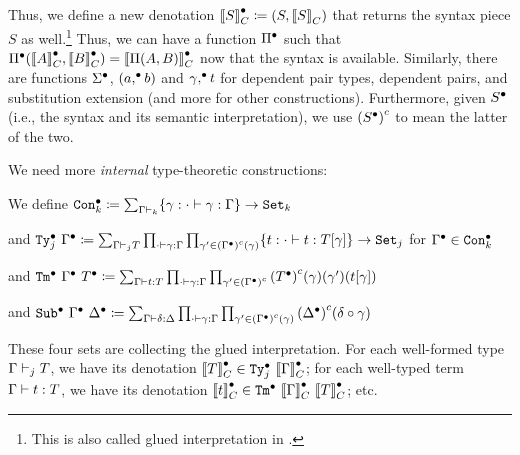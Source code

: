 Thus, we define a new denotation $\denotesCC{S} \coloneq (S, \denotesC{S})$
that returns the syntax piece $S$ as well.\footnote{This is also called
glued interpretation in \citet{sterling2019algebraic}.}
Thus, we can have a
function $\Glued{\Pi}$ such that $\GluedPi{\denotesCC{A}}{\denotesCC{B}} =
\denotesCC{\TyPi{A}{B}}$ now that the syntax is available.
Similarly, there are functions $\Glued{\Sigma}$, $\Gpair{a}{b}$  and
$\GSubstExt{\gm}{t}$ for dependent pair types, dependent pairs, and
substitution extension (and more for other constructions).
Furthermore, given $\Glued{S}$ (i.e., the syntax and its semantic interpretation),
we use $\Gmodel{\Glued{S}}$ to mean the latter of the two.

\newcommand{\GTy}[2]{\ensuremath{\Glued{\texttt{Ty}}_{#1}~{#2}}}
\newcommand{\GCon}[1]{\ensuremath{\Glued{\texttt{Con}}_{#1}}}
\newcommand{\GTm}[2]{\ensuremath{\Glued{\texttt{Tm}}~{#1}~{#2}}}
\newcommand{\GSub}[2]{\ensuremath{\Glued{\texttt{Sub}}~{#1}~{#2}}}
\newcommand{\GMWSig}[3]{\ensuremath{{\texttt{WSig}^C}_{#1}^{#3}~{#2}}}
\newcommand{\GWSig}[3]{\ensuremath{{\Glued{\texttt{WSig}}}_{#1}^{#3}~{#2}}}


We need more \emph{internal} type-theoretic constructions:

We define $\GCon{k} \coloneq \sum_{\goodCtx{\Gm}{k}} \{\gm : \goodSub{\cdot}{\gm}{\Gm} \} \to \Set{k}$ 


and $\GTy{j}{\Glued{\Gm}} \coloneq \sum_{\goodType{\Gm}{T}{j}} \prod_{\goodSub{\cdot}{\gm}{\Gm}}\prod_{\gm' \in \Gmodel{\Glued{\Gm}}(\gm)}\{t : \goodTerm{\cdot}{t}{\sub{T}{\gm}}\}\to\Set{j} $ for $\Glued{\Gm} \in \GCon{k}$

and $\GTm{\Glued{\Gm}}{\Glued{T}} \coloneq \sum_{\goodTerm{\Gm}{t}{T}} \prod_{\goodSub{\cdot}{\gm}{\Gm}} \prod_{\gm' \in\Gmodel{\Glued{\Gm}}} \Gmodel{\Glued{T}}(\gm)(\gm')(\sub{t}{\gm})$

and $\GSub{\Glued{\Gm}}{\Glued{\Dl}} \coloneq \sum_{\goodSub{\Gm}{\delta}{\Dl}} \prod_{\goodSub{\cdot}{\gm}{\Gm}} \prod_{\gm' \in \Gmodel{\Glued{\Gm}}(\gm)} \Gmodel{\Glued{\Dl}}(\delta \circ \gm) $

These four sets are collecting the glued interpretation.
For each well-formed type $\goodType{\Gm}{T}{j}$, we have its denotation $\denotesCC{T} \in \GTy{j}{\denotesCC{\Gm}}$;
for each well-typed term $\goodTerm{\Gm}{t}{T}$, we have its denotation $\denotesCC{t} \in \GTm{\denotesCC{\Gm}}{\denotesCC{T}}$;
etc.


